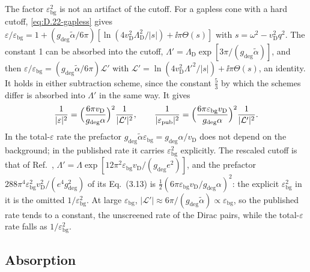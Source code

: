 The factor $\varepsilon_{\mathrm{bg}}^2$ is not an artifact of the cutoff. For a gapless cone with a hard cutoff, \cref{eq:D.22-gapless} gives $\varepsilon/\varepsilon_{\mathrm{bg}} = 1 + (g_{\mathrm{deg}}\tilde\alpha/6\pi)[\ln(4v_{\mathrm{D}}^2\Lambda_{\mathrm{D}}^2/|s|) + \ii\pi\Theta(s)]$ with $s = \omega^2 - v_{\mathrm{D}}^2q^2$. The constant 1 can be absorbed into the cutoff, $\Lambda' = \Lambda_{\mathrm{D}}\exp[3\pi/(g_{\mathrm{deg}}\tilde\alpha)]$, and then $\varepsilon/\varepsilon_{\mathrm{bg}} = (g_{\mathrm{deg}}\tilde\alpha/6\pi)\mathcal{L}'$ with $\mathcal{L}' = \ln(4v_{\mathrm{D}}^2\Lambda'^2/|s|) + \ii\pi\Theta(s)$, an identity. It holds in either subtraction scheme, since the constant $\tfrac53$ by which the schemes differ is absorbed into $\Lambda'$ in the same way. It gives
\begin{equation}
  \frac{1}{|\varepsilon|^2} = \Bigl(\frac{6\pi v_{\mathrm{D}}}{g_{\mathrm{deg}}\alpha}\Bigr)^2\frac{1}{|\mathcal{L}'|^2} , \qquad
  \frac{1}{|\varepsilon_{\mathrm{pub}}|^2} = \Bigl(\frac{6\pi\varepsilon_{\mathrm{bg}}v_{\mathrm{D}}}{g_{\mathrm{deg}}\alpha}\Bigr)^2\frac{1}{|\mathcal{L}'|^2} .
  \label{eq:D.41-lprime}
\end{equation}
In the total-$\varepsilon$ rate the prefactor $g_{\mathrm{deg}}\tilde\alpha\varepsilon_{\mathrm{bg}} = g_{\mathrm{deg}}\alpha/v_{\mathrm{D}}$ does not depend on the background; in the published rate it carries $\varepsilon_{\mathrm{bg}}^2$ explicitly. The rescaled cutoff is that of Ref.~\cite[text after Eq.~(3.13)]{hochberg2018detection}, $\Lambda' = \Lambda\exp[12\pi^2\varepsilon_{\mathrm{bg}}v_{\mathrm{D}}/(g_{\mathrm{deg}}e^2)]$, and the prefactor $288\pi^4\varepsilon_{\mathrm{bg}}^2v_{\mathrm{D}}^2/(e^4g_{\mathrm{deg}}^2)$ of its Eq.~(3.13) is $\frac12(6\pi\varepsilon_{\mathrm{bg}}v_{\mathrm{D}}/g_{\mathrm{deg}}\alpha)^2$: the explicit $\varepsilon_{\mathrm{bg}}^2$ in it is the omitted $1/\varepsilon_{\mathrm{bg}}^2$. At large $\varepsilon_{\mathrm{bg}}$, $|\mathcal{L}'| \approx 6\pi/(g_{\mathrm{deg}}\tilde\alpha) \propto \varepsilon_{\mathrm{bg}}$, so the published rate tends to a constant, the unscreened rate of the Dirac pairs, while the total-$\varepsilon$ rate falls as $1/\varepsilon_{\mathrm{bg}}^2$.

\subsection*{Absorption}

